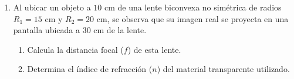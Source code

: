 \documentclass[11pt, letterpaper]{article}
\newif\ifshowanswers
\newcommand{\answer}[1]{ 
	\ifshowanswers 
	\par\vspace{0.15cm} 
	\begin{tcolorbox}[colback=blue!5!white, colframe=blue!60!white, arc=1mm, boxrule=0.5pt, title=\textbf{\footnotesize SOLUCIÓN PASO A PASO (DOCENTE)}] 
		\color{blue!80!black}\footnotesize #1 
	\end{tcolorbox} 
	\par\vspace{0.15cm} 
	\else 
	\par\vspace{0.3cm} 
	\fi 
}
\begin{document}
\begin{enumerate}[leftmargin=*, itemsep=0.8cm]
		\item Al ubicar un objeto a $10\text{ cm}$ de una lente biconvexa no simétrica de radios $R_1 = 15\text{ cm}$ y $R_2 = 20\text{ cm}$, se observa que su imagen real se proyecta en una pantalla ubicada a $30\text{ cm}$ de la lente. 
		\begin{enumerate}[label=\alph*), itemsep=0.2cm] 
			\item Calcula la distancia focal ($f$) de esta lente. 
			\item Determina el índice de refracción ($n$) del material transparente utilizado. 
		\end{enumerate} 
		\answer{ 
			a) $\frac{1}{f} = \frac{1}{10} + \frac{1}{30} = \frac{4}{30} \implies f = \mathbf{7,5\text{ cm}}$.\\[0.1cm] 
			b) $\frac{1}{7,5} = (n - 1) \left(\frac{1}{15} + \frac{1}{20}\right) \implies \frac{2}{15} = (n - 1) \cdot \frac{7}{60} \implies n - 1 = \frac{120}{105} = \frac{8}{7} \implies n \approx \mathbf{2,14}$. 
		} 
		

\end{enumerate}
\end{document}
